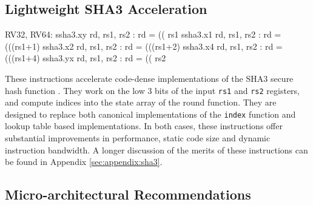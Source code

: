 
\subsection{Lightweight SHA3 Acceleration}
\label{sec:scalar:sha3}

\begin{isa}
RV32, RV64:
    ssha3.xy rd, rs1, rs2 : rd = (( rs1    %
    ssha3.x1 rd, rs1, rs2 : rd = (((rs1+1) %
    ssha3.x2 rd, rs1, rs2 : rd = (((rs1+2) %
    ssha3.x4 rd, rs1, rs2 : rd = (((rs1+4) %
    ssha3.yx rd, rs1, rs2 : rd = (( rs2    %
\end{isa}

These instructions accelerate code-dense implementations of the SHA3 secure
hash function \cite{nist:fips:202}.
They work on the low $3$ bits of the input {\tt rs1} and {\tt rs2} registers,
and compute indices into the state array of the round function.
They are designed to replace both canonical implementations of the
{\tt index} function and lookup table based implementations.
In both cases, these instructions offer substantial
improvements in performance, static code size and dynamic instruction
bandwidth.
A longer discussion of the merits of these instructions can
be found in Appendix \ref{sec:appendix:sha3}.


\subsection{Micro-architectural Recommendations}




